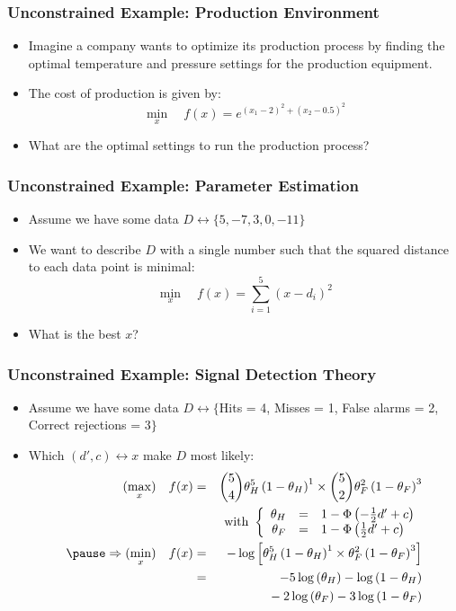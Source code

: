 \documentclass{beamer}
\begin{document}
\begin{frame}
  \frametitle{Unconstrained Example: Production Environment}

\begin{itemize}
\item Imagine a company wants to optimize its production process by finding the optimal temperature and pressure settings for the production equipment.
\item The cost of production is given by:
$$\min_{x} \quad f(x) = e^{(x_1-2)^2 + (x_2-0.5)^2}$$
\item What are the optimal settings to run the production process?
\end{itemize}
\end{frame}


\begin{frame}
  \frametitle{Unconstrained Example: Parameter Estimation}

\begin{itemize}
\item Assume we have some data $D \leftrightarrow \{5, -7, 3, 0, -11\}$
\item We want to describe $D$ with a single number such that the squared distance to each data point is minimal:
$$\min_{x} \quad f(x) = \sum_{i=1}^5 \left(x - d_i\right)^2$$
\item What is the best $x$?
\end{itemize}
\end{frame}


\begin{frame}
  \frametitle{Unconstrained Example: Signal Detection Theory}

\begin{itemize}
\item Assume we have some data $D \leftrightarrow \{$Hits = 4, Misses = 1, False alarms = 2, Correct rejections = 3$\}$
\item Which $(d',c) \leftrightarrow x$ make $D$ most likely:
\begin{eqnarray*}
(\max_{x}) \quad f(x) &=& {5 \choose 4} \theta_H^{5}\left(1-\theta_H\right)^1 \times {5 \choose 2} \theta_F^{2}\left(1-\theta_F\right)^3\\
&&\text{ with }\left\{
\begin{array}{rcl}
\theta_H &=& 1-\Phi\left(-\frac{1}{2}d'+c\right)\\
\theta_F &=& 1-\Phi\left( \frac{1}{2}d'+c\right)
\end{array}\right.\\
\pause
\Rightarrow (\min_{x}) \quad f(x) &=& -\log\left[ \theta_H^{5}\left(1-\theta_H\right)^1 \times  \theta_F^{2}\left(1-\theta_F\right)^3\right]\\
 &=& 
-5\log\left(\theta_H\right)
- \log\left(1-\theta_H\right)\\
&&{\quad}-2\log\left( \theta_F\right)
-3\log\left(1-\theta_F\right)
\end{eqnarray*}
\end{itemize}
\end{frame}
\end{document}
